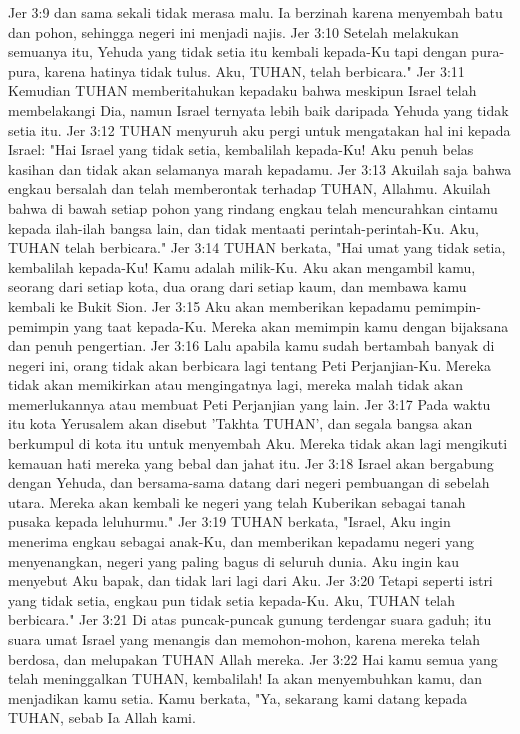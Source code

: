 Jer 3:9  dan sama sekali tidak merasa malu. Ia berzinah karena menyembah batu dan pohon, sehingga negeri ini menjadi najis.
Jer 3:10  Setelah melakukan semuanya itu, Yehuda yang tidak setia itu kembali kepada-Ku tapi dengan pura-pura, karena hatinya tidak tulus. Aku, TUHAN, telah berbicara."
Jer 3:11  Kemudian TUHAN memberitahukan kepadaku bahwa meskipun Israel telah membelakangi Dia, namun Israel ternyata lebih baik daripada Yehuda yang tidak setia itu.
Jer 3:12  TUHAN menyuruh aku pergi untuk mengatakan hal ini kepada Israel: "Hai Israel yang tidak setia, kembalilah kepada-Ku! Aku penuh belas kasihan dan tidak akan selamanya marah kepadamu.
Jer 3:13  Akuilah saja bahwa engkau bersalah dan telah memberontak terhadap TUHAN, Allahmu. Akuilah bahwa di bawah setiap pohon yang rindang engkau telah mencurahkan cintamu kepada ilah-ilah bangsa lain, dan tidak mentaati perintah-perintah-Ku. Aku, TUHAN telah berbicara."
Jer 3:14  TUHAN berkata, "Hai umat yang tidak setia, kembalilah kepada-Ku! Kamu adalah milik-Ku. Aku akan mengambil kamu, seorang dari setiap kota, dua orang dari setiap kaum, dan membawa kamu kembali ke Bukit Sion.
Jer 3:15  Aku akan memberikan kepadamu pemimpin-pemimpin yang taat kepada-Ku. Mereka akan memimpin kamu dengan bijaksana dan penuh pengertian.
Jer 3:16  Lalu apabila kamu sudah bertambah banyak di negeri ini, orang tidak akan berbicara lagi tentang Peti Perjanjian-Ku. Mereka tidak akan memikirkan atau mengingatnya lagi, mereka malah tidak akan memerlukannya atau membuat Peti Perjanjian yang lain.
Jer 3:17  Pada waktu itu kota Yerusalem akan disebut 'Takhta TUHAN', dan segala bangsa akan berkumpul di kota itu untuk menyembah Aku. Mereka tidak akan lagi mengikuti kemauan hati mereka yang bebal dan jahat itu.
Jer 3:18  Israel akan bergabung dengan Yehuda, dan bersama-sama datang dari negeri pembuangan di sebelah utara. Mereka akan kembali ke negeri yang telah Kuberikan sebagai tanah pusaka kepada leluhurmu."
Jer 3:19  TUHAN berkata, "Israel, Aku ingin menerima engkau sebagai anak-Ku, dan memberikan kepadamu negeri yang menyenangkan, negeri yang paling bagus di seluruh dunia. Aku ingin kau menyebut Aku bapak, dan tidak lari lagi dari Aku.
Jer 3:20  Tetapi seperti istri yang tidak setia, engkau pun tidak setia kepada-Ku. Aku, TUHAN telah berbicara."
Jer 3:21  Di atas puncak-puncak gunung terdengar suara gaduh; itu suara umat Israel yang menangis dan memohon-mohon, karena mereka telah berdosa, dan melupakan TUHAN Allah mereka.
Jer 3:22  Hai kamu semua yang telah meninggalkan TUHAN, kembalilah! Ia akan menyembuhkan kamu, dan menjadikan kamu setia. Kamu berkata, "Ya, sekarang kami datang kepada TUHAN, sebab Ia Allah kami.
